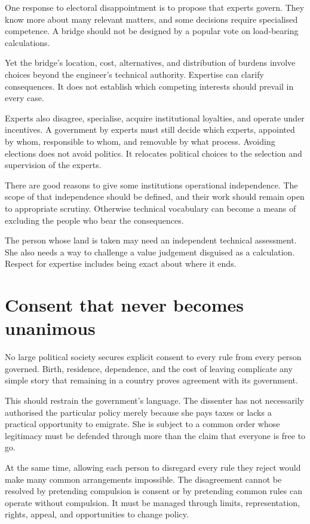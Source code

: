 \documentclass[12pt,a4paper]{book}
\begin{document}
One response to electoral disappointment is to propose that experts govern. They know more about many relevant matters, and some decisions require specialised competence. A bridge should not be designed by a popular vote on load-bearing calculations.

Yet the bridge's location, cost, alternatives, and distribution of burdens involve choices beyond the engineer's technical authority. Expertise can clarify consequences. It does not establish which competing interests should prevail in every case.

Experts also disagree, specialise, acquire institutional loyalties, and operate under incentives. A government by experts must still decide which experts, appointed by whom, responsible to whom, and removable by what process. Avoiding elections does not avoid politics. It relocates political choices to the selection and supervision of the experts.

There are good reasons to give some institutions operational independence. The scope of that independence should be defined, and their work should remain open to appropriate scrutiny. Otherwise technical vocabulary can become a means of excluding the people who bear the consequences.

The person whose land is taken may need an independent technical assessment. She also needs a way to challenge a value judgement disguised as a calculation. Respect for expertise includes being exact about where it ends.

\section*{Consent that never becomes unanimous}

No large political society secures explicit consent to every rule from every person governed. Birth, residence, dependence, and the cost of leaving complicate any simple story that remaining in a country proves agreement with its government.

This should restrain the government's language. The dissenter has not necessarily authorised the particular policy merely because she pays taxes or lacks a practical opportunity to emigrate. She is subject to a common order whose legitimacy must be defended through more than the claim that everyone is free to go.

At the same time, allowing each person to disregard every rule they reject would make many common arrangements impossible. The disagreement cannot be resolved by pretending compulsion is consent or by pretending common rules can operate without compulsion. It must be managed through limits, representation, rights, appeal, and opportunities to change policy.
\end{document}
